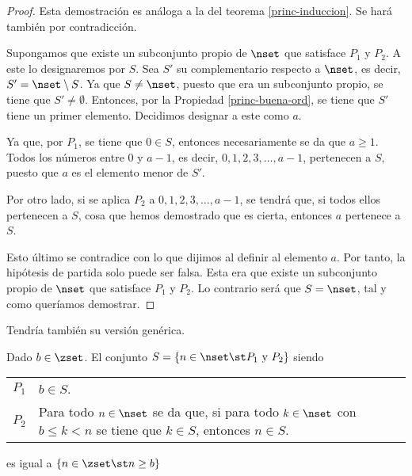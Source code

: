\begin{proof}
  Esta demostración es análoga a la del teorema \ref{princ-induccion}. Se
  hará también por contradicción.

  Supongamos que existe un subconjunto propio de $\nset$ que satisface $P_1$
  y $P_2$. A este lo designaremos por $S$. Sea $S'$ su complementario
  respecto a $\nset$, es decir, $S' = \nset \setminus S$. Ya que $S \neq
  \nset$, puesto que era un subconjunto propio, se tiene que $S' \neq
  \emptyset$. Entonces, por la Propiedad \ref{princ-buena-ord}, se tiene que
  $S'$ tiene un primer elemento. Decidimos designar a este como $a$.

  Ya que, por $P_1$, se tiene que $0 \in S$, entonces necesariamente se da
  que $a \geq 1$. Todos los números entre 0 y $a - 1$, es decir, $0, 1, 2,
  3, \ldots, a - 1$, pertenecen a $S$, puesto que $a$ es el elemento menor
  de $S'$.

  Por otro lado, si se aplica $P_2$ a $0, 1, 2, 3, \ldots, a - 1$, se tendrá
  que, si todos ellos pertenecen a $S$, cosa que hemos demostrado que es
  cierta, entonces $a$ pertenece a $S$.

  Esto último se contradice con lo que dijimos al definir al elemento $a$.
  Por tanto, la hipótesis de partida solo puede ser falsa. Esta era que
  existe un subconjunto propio de $\nset$ que satisface $P_1$ y $P_2$. Lo
  contrario será que $S = \nset$, tal y como queríamos demostrar.
\end{proof}

Tendría también su versión genérica.

\begin{theorem}
  Dado $b \in \zset$. El conjunto $S = \{n \in \nset \st P_1 \ \text{y} \
  P_2\}$ siendo

  \begin{center}
    \begin{tabular}{l p{}}
      $P_1$ & $b \in S$. \\
      $P_2$ & Para todo $n \in \nset$ se da que, si para todo $k \in \nset$
        con $b \leq k < n$ se tiene que $k \in S$, entonces $n \in S$.
    \end{tabular}
  \end{center}

  \noindent es igual a $\{n \in \zset \st n \geq b\}$
\end{theorem}













